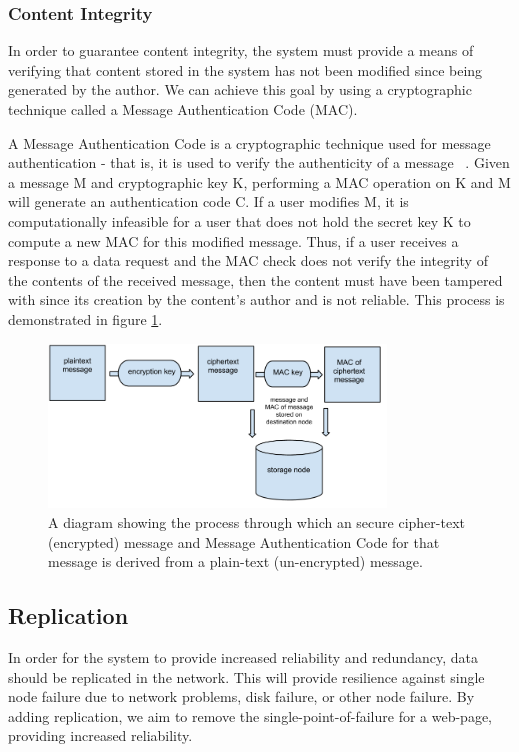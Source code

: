 \subsubsection{Content Integrity}

In order to guarantee content integrity, the system must provide a means of verifying that content stored in the system
has not been modified since being generated by the author. We can achieve this goal by using a cryptographic
technique called a Message Authentication Code (MAC).

A Message Authentication Code is a cryptographic technique used for message authentication - that is, it is used to verify
the authenticity of a message ~\cite{hmac}. Given a message M and cryptographic key K, performing a MAC operation on K and
M will generate an authentication code C. If a user modifies M, it is computationally infeasible for a user that does not
hold the secret key K to compute a new MAC for this modified message. Thus, if a user receives a response to a data request and
the MAC check does not verify the integrity of the contents of the received message, then the content must have been tampered
with since its creation by the content's author and is not reliable. This process is demonstrated in figure \ref{fig:hmac}.

\begin{figure}[H]
    \centering
    \includegraphics[width=0.8\textwidth]{img/mac.png}
    \caption{A diagram showing the process through which an secure cipher-text (encrypted) message and Message
    Authentication Code for that message is derived from a plain-text (un-encrypted) message.}
    \label{fig:hmac}
\end{figure}


\subsection{Replication}

In order for the system to provide increased reliability and redundancy, data should be
replicated in the network. This will provide resilience against single node failure due to network problems,
disk failure, or other node failure. By adding replication, we aim to remove the single-point-of-failure for a
web-page, providing increased reliability.


